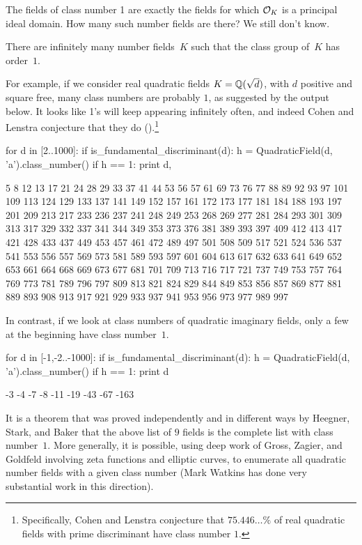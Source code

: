 The fields of class number 1 are exactly the fields for
which $\mathcal{O}_K$ is a principal ideal domain.  How many such
number fields are there?   We still don't know.
\begin{conjecture}
	There are infinitely many number fields~$K$ such that the class
	group of~$K$ has order~$1$.
\end{conjecture}
For example, if we consider real quadratic fields $K=\mathbb{Q}(\sqrt{d})$,
with $d$ positive and square free, many class numbers are probably $1$,
as suggested by the \sage output below.
It looks like 1's will keep appearing infinitely often, and indeed
Cohen and Lenstra conjecture that they do
(\cite{cohen-lenstra:heuristics}).\footnote{Specifically, Cohen and
Lenstra conjecture that $75.446\dots\%$ of real quadratic fields
with prime discriminant have class number $1$.}
\begin{sagecode}
\begin{sagecell}
for d in [2..1000]:
    if is_fundamental_discriminant(d):
        h = QuadraticField(d, 'a').class_number()
        if h == 1:
            print d,
\end{sagecell}
\begin{sageout}
5 8 12 13 17 21 24 28 29 33 37 41 44 53 56 57 61 69
73 76 77 88 89 92 93 97 101 109 113 124 129 133 137
141 149 152 157 161 172 173 177 181 184 188 193 197
201 209 213 217 233 236 237 241 248 249 253 268 269
277 281 284 293 301 309 313 317 329 332 337 341 344
349 353 373 376 381 389 393 397 409 412 413 417 421
428 433 437 449 453 457 461 472 489 497 501 508 509
517 521 524 536 537 541 553 556 557 569 573 581 589
593 597 601 604 613 617 632 633 641 649 652 653 661
664 668 669 673 677 681 701 709 713 716 717 721 737
749 753 757 764 769 773 781 789 796 797 809 813 821
824 829 844 849 853 856 857 869 877 881 889 893 908
913 917 921 929 933 937 941 953 956 973 977 989 997
\end{sageout}
\end{sagecode}
In contrast, if we look at class numbers of quadratic imaginary fields,
only a few at the beginning have class number~$1$.
\begin{sagecode}
\begin{sagecell}
for d in [-1,-2..-1000]:
    if is_fundamental_discriminant(d):
        h = QuadraticField(d, 'a').class_number()
        if h == 1:
            print d
\end{sagecell}
\begin{sageout}
-3 -4 -7 -8 -11 -19 -43 -67 -163
\end{sageout}
\end{sagecode}
It is a theorem that was proved independently and in different ways by
Heegner, Stark, and Baker that the above list of $9$ fields is the
complete list with class number~$1$.  More generally, it is possible,
using deep work of Gross, Zagier, and Goldfeld involving zeta
functions and elliptic curves, to enumerate all quadratic number
fields with a given class number (Mark Watkins has done very
substantial work in this direction).

